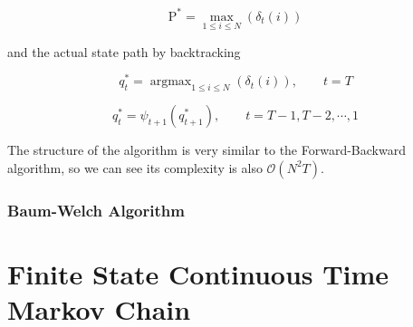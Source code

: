\documentclass[thesis=M,english]{FITthesis}[2012/10/20]
\newcommand{\argmax}{\mathop{\mathrm{argmax}}}
\begin{document}
\begin{equation}
\mathrm{P}^* = \max_{1 \leq i \leq N} ( \delta_{t}(i) )  
\end{equation}

and the actual state path by backtracking

\begin{equation}
q_t^* = \argmax_{1 \leq i \leq N} ( \delta_{t}(i) ),  \qquad t = T  
\end{equation}

\begin{equation}
q_t^* = \psi_{t+1}(q_{t+1}^*), \qquad t = T-1, T-2, \cdots, 1  
\end{equation}

The structure of the algorithm is very similar to the Forward-Backward algorithm, so we can see its complexity is also $\mathcal{O}(N^2T)$.


 

\subsection{Baum-Welch Algorithm}

\chapter{Finite State Continuous Time Markov Chain} 

\end{document}
